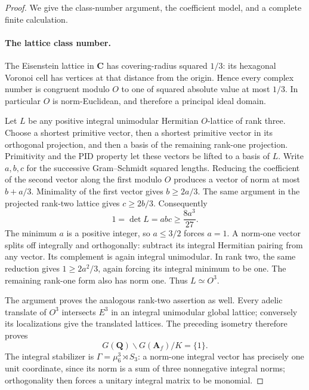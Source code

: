 \begin{proof}
We give the class-number argument, the coefficient model, and a
complete finite calculation.

\paragraph{The lattice class number.}
The Eisenstein lattice in $\mathbf C$ has covering-radius squared
$1/3$: its hexagonal Voronoi cell has vertices at that distance from
the origin.  Hence every complex number is congruent modulo $O$ to
one of squared absolute value at most $1/3$.  In particular $O$ is
norm-Euclidean, and therefore a principal ideal domain.

Let $L$ be any positive integral unimodular Hermitian $O$-lattice of
rank three.  Choose a shortest primitive vector, then a shortest
primitive vector in its orthogonal projection, and then a basis of the
remaining rank-one projection.  Primitivity and the PID property let
these vectors be lifted to a basis of $L$.  Write $a,b,c$ for the
successive Gram--Schmidt squared lengths.  Reducing the coefficient
of the second vector along the first modulo $O$ produces a vector of
norm at most $b+a/3$.  Minimality of the first vector gives
$b\geq 2a/3$.  The same argument in the projected rank-two lattice
gives $c\geq 2b/3$.  Consequently
\[
 1=\det L=abc\geq \frac{8a^3}{27}.
 \tag{UH.2}
\]
The minimum $a$ is a positive integer, so $a\leq3/2$ forces $a=1$.
A norm-one vector splits off integrally and orthogonally: subtract
its integral Hermitian pairing from any vector.  Its complement is
again integral unimodular.  In rank two, the same reduction gives
$1\geq2a^2/3$, again forcing its integral minimum to be one.  The
remaining rank-one form also has norm one.  Thus $L\simeq O^3$.

The argument proves the analogous rank-two assertion as well.  Every
adelic translate of $O^3$ intersects $E^3$ in an integral unimodular
global lattice; conversely its localizations give the translated
lattices.  The preceding isometry therefore proves
\[
 G(\mathbf Q)\backslash G(\mathbf A_f)/K=\{1\}.
 \tag{UH.3}
\]
The integral stabilizer is
$\Gamma=\mu_6^3\rtimes S_3$: a norm-one integral vector has precisely
one unit coordinate, since its norm is a sum of three nonnegative
integral norms; orthogonality then forces a unitary integral matrix
to be monomial.


\end{proof}
